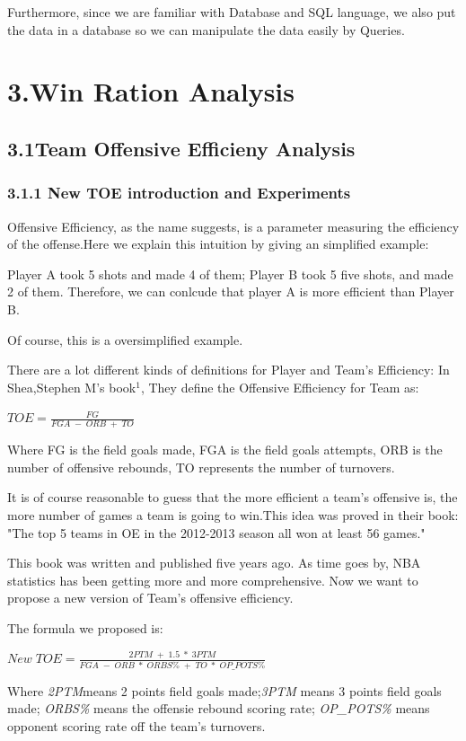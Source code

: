 \documentclass[11pt]{article}
\begin{document}
Furthermore, since we are familiar with Database and SQL language, we also put the data in a database so we can manipulate the data easily by Queries.
\section*{3.Win Ration Analysis}
\subsection*{3.1Team Offensive Efficieny Analysis}
\subsubsection*{3.1.1 New TOE introduction and Experiments}
\hspace{1.5em}Offensive Efficiency, as the name suggests, is a parameter measuring the efficiency of the offense.Here we explain this intuition by giving an simplified example:

Player A took 5 shots and made 4 of them; Player B took 5 five shots, and made 2 of them. Therefore, we can conlcude that player A is more efficient than Player B.

Of course, this is a oversimplified example.

There are a lot different kinds of definitions for Player and Team's Efficiency:
In Shea,Stephen M's book$^1$, They define the Offensive Efficiency for Team as:
\begin{center}
$TOE = \frac{FG}{FGA \;-\; ORB\; + \;TO}$
\end{center}
Where FG is the field goals made, FGA is the field goals attempts, ORB is the number of offensive rebounds, TO represents the number of turnovers. 

It is of course reasonable to guess that the more efficient a team's offensive is, the more number of games a team is going to win.This idea was proved in their book: "The top 5 teams in OE in the 2012-2013 season all won at least 56 games."

This book was written and published five years ago. As time goes by, NBA statistics has been getting more and more comprehensive.
Now we want to propose a new version of Team's offensive efficiency.

The formula we proposed is:
\begin{center}
$New\;TOE = \frac{2PTM \;+ \;1.5 \;* \;3PTM}{FGA \;-\; ORB \;*\; ORBS\% \; + \;TO\; * \;OP\_POTS\%}$
\end{center}
Where \textit{2PTM}means 2 points field goals made;\textit{3PTM} means 3 points field goals made; \textit{ ORBS\%} means the offensie rebound scoring rate; \textit{OP\_POTS\%} means opponent scoring rate off the team's turnovers.
\end{document}
